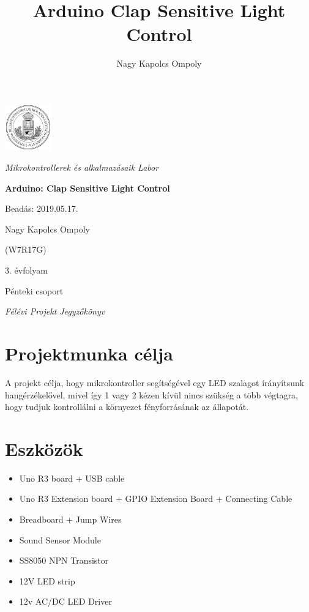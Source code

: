 \documentclass[a4paper,11pt]{article}
\author{Nagy Kapolcs Ompoly}
\title{Arduino Clap Sensitive Light Control}
\date{ }
\begin{document}
\begin{titlepage}
	\centering
	\includegraphics[width=0.15\textwidth]{eltecimer.jpg}\par
	\vspace{1cm}
	{\Large\itshape Mikrokontrollerek és alkalmazásaik Labor\par}
	{\huge\bfseries Arduino: Clap Sensitive Light Control\par}
	
	\vfill
	
	\raggedleft
	Beadás: 2019.05.17.\par
	\vspace{0.5cm}
	Nagy Kapolcs Ompoly\par
	(W7R17G)\par
	3. évfolyam\par
	Pénteki csoport\par
	
	\vspace{0.5cm}

	\centering
	{\small\itshape Félévi Projekt Jegyzőkönyv \par}
\end{titlepage}
\clearpage
\setcounter{page}{1}
\newpage
\renewcommand{\thesection}{\Roman{section}}
\renewcommand{\thesubsection}{\thesection.\arabic{subsection}}
\renewcommand{\thesubsubsection}{\thesubsection.\arabic{subsubsection}}
\section{Projektmunka célja}
A projekt célja, hogy mikrokontroller segítségével egy LED szalagot írányítsunk hangérzékelővel, mivel így 1 vagy 2 kézen kívül nincs szükség a több végtagra, hogy tudjuk kontrollálni a környezet fényforrásának az állapotát.

\section{Eszközök}

\begin{itemize}
	\item Uno R3 board + USB cable
	\item Uno R3 Extension board + GPIO Extension Board + Connecting Cable
	\item Breadboard + Jump Wires
	\item Sound Sensor Module 
	\item SS8050 NPN Transistor
	\item 12V LED strip
	\item 12v AC/DC LED Driver
\end{itemize}
\end{document}
